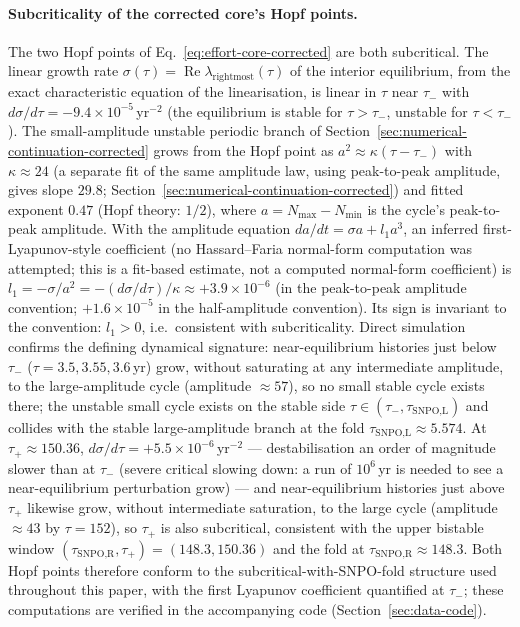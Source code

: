 \documentclass[twocolumn,10pt]{article}
\begin{document}
\paragraph{Subcriticality of the corrected core's Hopf points.} The two Hopf points of Eq.~\eqref{eq:effort-core-corrected} are both subcritical. The linear growth rate $\sigma(\tau)=\operatorname{Re}\lambda_{\text{rightmost}}(\tau)$ of the interior equilibrium, from the exact characteristic equation of the linearisation, is linear in $\tau$ near $\tau_-$ with $d\sigma/d\tau=-9.4\times10^{-5}$\,yr$^{-2}$ (the equilibrium is stable for $\tau>\tau_-$, unstable for $\tau<\tau_-$). The small-amplitude unstable periodic branch of Section~\ref{sec:numerical-continuation-corrected} grows from the Hopf point as $a^2\approx\kappa(\tau-\tau_-)$ with $\kappa\approx24$ (a separate fit of the same amplitude law, using peak-to-peak amplitude, gives slope $29.8$; Section~\ref{sec:numerical-continuation-corrected}) and fitted exponent $0.47$ (Hopf theory: $1/2$), where $a=N_{\max}-N_{\min}$ is the cycle's peak-to-peak amplitude. With the amplitude equation $da/dt=\sigma a + l_1 a^3$, an inferred first-Lyapunov-style coefficient (no Hassard--Faria normal-form computation was attempted; this is a fit-based estimate, not a computed normal-form coefficient) is $l_1=-\sigma/a^2=-(d\sigma/d\tau)/\kappa\approx+3.9\times10^{-6}$ (in the peak-to-peak amplitude convention; $+1.6\times10^{-5}$ in the half-amplitude convention). Its sign is invariant to the convention: $l_1>0$, i.e.\ consistent with subcriticality. Direct simulation confirms the defining dynamical signature: near-equilibrium histories just below $\tau_-$ ($\tau=3.5,3.55,3.6$\,yr) grow, without saturating at any intermediate amplitude, to the large-amplitude cycle (amplitude $\approx57$), so no small stable cycle exists there; the unstable small cycle exists on the stable side $\tau\in(\tau_-,\tau_{\text{SNPO,L}})$ and collides with the stable large-amplitude branch at the fold $\tau_{\text{SNPO,L}}\approx5.574$. At $\tau_+\approx150.36$, $d\sigma/d\tau=+5.5\times10^{-6}$\,yr$^{-2}$ --- destabilisation an order of magnitude slower than at $\tau_-$ (severe critical slowing down: a run of $10^6$\,yr is needed to see a near-equilibrium perturbation grow) --- and near-equilibrium histories just above $\tau_+$ likewise grow, without intermediate saturation, to the large cycle (amplitude $\approx43$ by $\tau=152$), so $\tau_+$ is also subcritical, consistent with the upper bistable window $(\tau_{\text{SNPO,R}},\tau_+)=(148.3,150.36)$ and the fold at $\tau_{\text{SNPO,R}}\approx148.3$. Both Hopf points therefore conform to the subcritical-with-SNPO-fold structure used throughout this paper, with the first Lyapunov coefficient quantified at $\tau_-$; these computations are verified in the accompanying code (Section~\ref{sec:data-code}).
\end{document}
